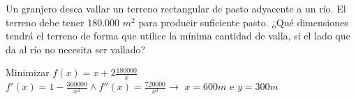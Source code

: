 \documentclass[addpoints,spanish, 12pt,a4paper]{exam}
\begin{document}
\begin{questions}
       

\question[4] Un granjero desea vallar un terreno rectangular de pasto adyacente a un río. El terreno debe tener 180.000
$m^2$
para producir suficiente pasto. ¿Qué dimensiones tendrá el terreno de
forma que utilice la mínima cantidad de valla, si el lado que da al río no necesita ser vallado?
\begin{solution}
    Minimizar $f(x)=x +2 \frac{180000}{x}$ \\
    $f'(x)= 1 - \frac{360000}{x^{2}} \land f''(x)=\frac{720000}{x^{3}} \to $
    $x=600 m$ e $y=300 m$
\end{solution}

        

\end{questions}
\end{document}

